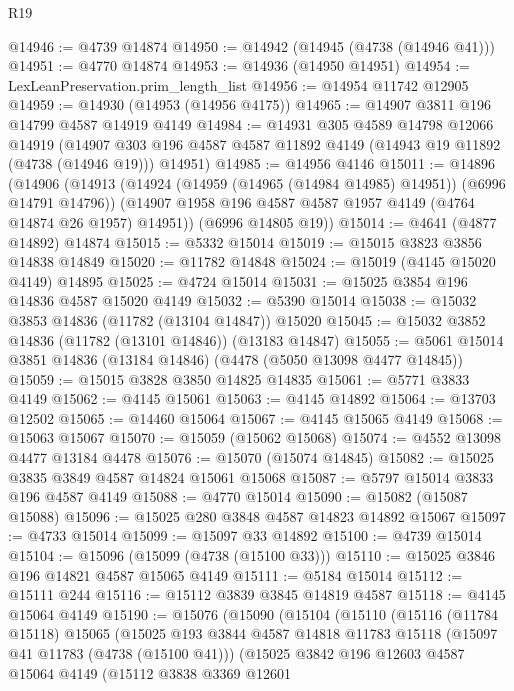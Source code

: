\begin{lexlean}{R19}
\begin{coremodule}
@14946 := @4739 @14874
@14950 := @14942 (@14945 (@4738 (@14946 @41)))
@14951 := @4770 @14874
@14953 := @14936 (@14950 @14951)
@14954 := LexLeanPreservation.prim_length_list
@14956 := @14954 @11742 @12905
@14959 := @14930 (@14953 (@14956 @4175))
@14965 := @14907 @3811 @196 @14799 @4587 @14919 @4149
@14984 := @14931
    @305
    @4589
    @14798
    @12066
    @14919
    (@14907 @303 @196 @4587 @4587 @11892 @4149 (@14943 @19 @11892 (@4738 (@14946 @19))) @14951)
@14985 := @14956 @4146
@15011 := @14896
    (@14906
      (@14913
        (@14924 (@14959 (@14965 (@14984 @14985) @14951)) (@6996 @14791 @14796))
        (@14907 @1958 @196 @4587 @4587 @1957 @4149 (@4764 @14874 @26 @1957) @14951))
      (@6996 @14805 @19))
@15014 := @4641 (@4877 @14892) @14874
@15015 := @5332 @15014
@15019 := @15015 @3823 @3856 @14838 @14849
@15020 := @11782 @14848
@15024 := @15019 (@4145 @15020 @4149) @14895
@15025 := @4724 @15014
@15031 := @15025 @3854 @196 @14836 @4587 @15020 @4149
@15032 := @5390 @15014
@15038 := @15032 @3853 @14836 (@11782 (@13104 @14847)) @15020
@15045 := @15032 @3852 @14836 (@11782 (@13101 @14846)) (@13183 @14847)
@15055 := @5061 @15014 @3851 @14836 (@13184 @14846) (@4478 (@5050 @13098 @4477 @14845))
@15059 := @15015 @3828 @3850 @14825 @14835
@15061 := @5771 @3833 @4149
@15062 := @4145 @15061
@15063 := @4145 @14892
@15064 := @13703 @12502
@15065 := @14460 @15064
@15067 := @4145 @15065 @4149
@15068 := @15063 @15067
@15070 := @15059 (@15062 @15068)
@15074 := @4552 @13098 @4477 @13184 @4478
@15076 := @15070 (@15074 @14845)
@15082 := @15025 @3835 @3849 @4587 @14824 @15061 @15068
@15087 := @5797 @15014 @3833 @196 @4587 @4149
@15088 := @4770 @15014
@15090 := @15082 (@15087 @15088)
@15096 := @15025 @280 @3848 @4587 @14823 @14892 @15067
@15097 := @4733 @15014
@15099 := @15097 @33 @14892
@15100 := @4739 @15014
@15104 := @15096 (@15099 (@4738 (@15100 @33)))
@15110 := @15025 @3846 @196 @14821 @4587 @15065 @4149
@15111 := @5184 @15014
@15112 := @15111 @244
@15116 := @15112 @3839 @3845 @14819 @4587
@15118 := @4145 @15064 @4149
@15190 := @15076
    (@15090
      (@15104
        (@15110
          (@15116
            (@11784 @15118)
            @15065
            (@15025
              @193
              @3844
              @4587
              @14818
              @11783
              @15118
              (@15097 @41 @11783 (@4738 (@15100 @41)))
              (@15025
                @3842
                @196
                @12603
                @4587
                @15064
                @4149
                (@15112
                  @3838
                  @3369
                  @12601

\end{coremodule}
\end{lexlean}
